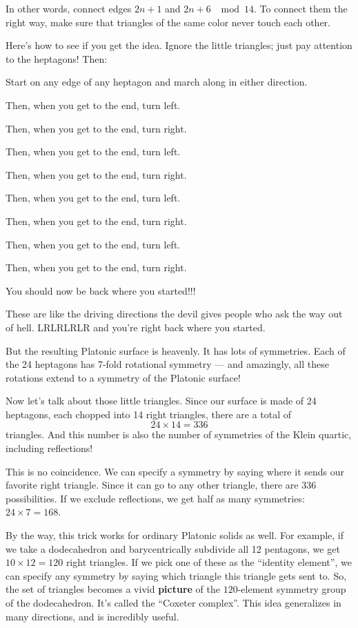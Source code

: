 \documentclass{article}
\begin{document}
In other words, connect edges \(2n+1\) and \(2n+6\) \(\mod 14\). To
connect them the right way, make sure that triangles of the same color
never touch each other.

Here's how to see if you get the idea. Ignore the little triangles; just
pay attention to the heptagons! Then:

Start on any edge of any heptagon and march along in either direction.

Then, when you get to the end, turn left.

Then, when you get to the end, turn right.

Then, when you get to the end, turn left.

Then, when you get to the end, turn right.

Then, when you get to the end, turn left.

Then, when you get to the end, turn right.

Then, when you get to the end, turn left.

Then, when you get to the end, turn right.

You should now be back where you started!!!

These are like the driving directions the devil gives people who ask the
way out of hell. LRLRLRLR and you're right back where you started.

But the resulting Platonic surface is heavenly. It has lots of
symmetries. Each of the 24 heptagons has 7-fold rotational symmetry ---
and amazingly, all these rotations extend to a symmetry of the Platonic
surface!

Now let's talk about those little triangles. Since our surface is made
of 24 heptagons, each chopped into 14 right triangles, there are a total
of \[24 \times 14 = 336\] triangles. And this number is also the number
of symmetries of the Klein quartic, including reflections!

This is no coincidence. We can specify a symmetry by saying where it
sends our favorite right triangle. Since it can go to any other
triangle, there are 336 possibilities. If we exclude reflections, we get
half as many symmetries: \(24 \times 7 = 168\).

By the way, this trick works for ordinary Platonic solids as well. For
example, if we take a dodecahedron and barycentrically subdivide all 12
pentagons, we get \(10 \times 12 = 120\) right triangles. If we pick one
of these as the ``identity element'', we can specify any symmetry by
saying which triangle this triangle gets sent to. So, the set of
triangles becomes a vivid \textbf{picture} of the \(120\)-element
symmetry group of the dodecahedron. It's called the ``Coxeter complex''.
This idea generalizes in many directions, and is incredibly useful.
\end{document}
